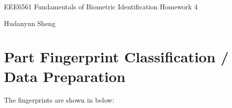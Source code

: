 \documentclass[a4paper]{article}
\begin{document}
\begin{spacing}{2.0}
\begin{flushleft}\begin{huge}EEE6561  Fundamentals of Biometric Identification   Homework 4\end{huge}
\end{flushleft}
\begin{flushright}\begin{Large}Hudanyun Sheng\end{Large}\end{flushright}

\section*{\huge\textbf{ Part \uppercase\expandafter{} Fingerprint Classification / Data Preparation}  }
	\normalsize
		The fingerprints are shown in below:
	

\end{spacing}
\end{document}
